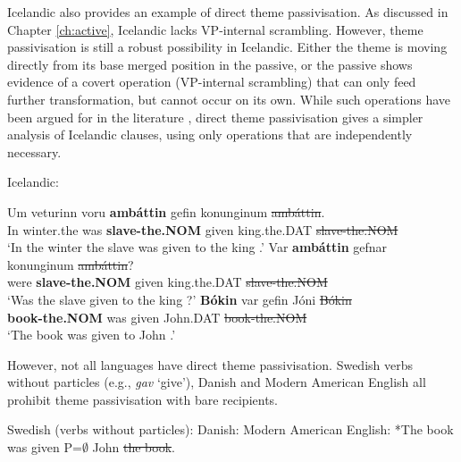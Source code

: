 Icelandic also provides an example of direct theme passivisation. As discussed in Chapter \ref{ch:active}, Icelandic lacks VP-internal scrambling. However, theme passivisation is still a robust possibility in Icelandic. Either the theme is moving directly from its base merged position in the passive, or the passive shows evidence of a covert operation (VP-internal scrambling) that can only feed further transformation, but cannot occur on its own. While such operations have been argued for in the literature \citep[119ff]{Richards.2001}, direct theme passivisation gives a simpler analysis of Icelandic clauses, using only operations that are independently necessary.

\begin{exe}
	\ex Icelandic:\label{ex:ice-directthe}
\begin{xlist}
	\ex \gll Um veturinn voru \textbf{amb\'{a}ttin} gefin konunginum \sout{amb\'{a}ttin}.\\
	In winter.the was \textbf{slave-the.NOM} given king.the.DAT \sout{slave-the.NOM}\\
\trans `In the winter the slave was given to the king \citep[ex. 47b]{Zaenen.1985}.'
\ex \gll Var \textbf{amb\'{a}ttin} gefnar konunginum \sout{amb\'{a}ttin}?\\
were \textbf{slave-the.NOM} given king.the.DAT \sout{slave-the.NOM}\\
\trans `Was the slave given to the king \citep[ex. 48b]{Zaenen.1985}?'
\ex \gll \textbf{B\'{o}kin} var gefin J\'{o}ni \sout{B\'{o}kin}\\
\textbf{book-the.NOM} was given John.DAT \sout{book-the.NOM}\\
\trans `The book was given to John \citep{Holmberg.1995,Bardal.2001}.'
\end{xlist}
\end{exe}

However, not all languages have direct theme passivisation. Swedish verbs without particles (e.g., \textit{gav} `give'), Danish and Modern American English all prohibit theme passivisation with bare recipients.

\begin{exe}
	\ex Swedish (verbs without particles):\label{ex:swe-nopart-pass}
	 \ex Danish:\label{ex:dan-pass}
\ex Modern American English: *The book was given P=$\emptyset$ John \sout{the book}.\label{ex:amen-pass}
\end{exe}

